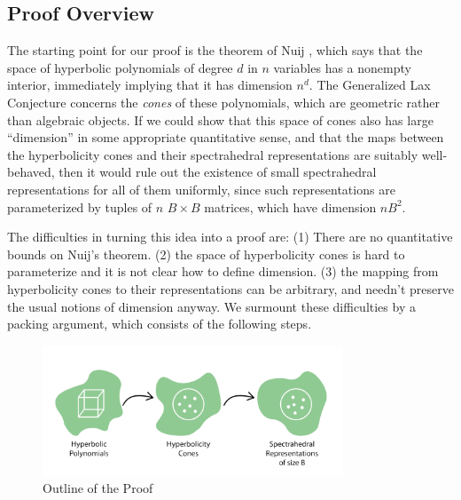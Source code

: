 \subsection{Proof Overview}

The starting point for our proof is the theorem of Nuij \cite{nuij1969note},
which says that the space of hyperbolic polynomials of degree $d$ in $n$
variables has a nonempty interior, immediately implying that it has dimension
$n^d$. The Generalized Lax Conjecture concerns the {\em cones} of these
polynomials, which are geometric rather than algebraic objects. If we could
show that this space of cones also has large ``dimension'' in some appropriate quantitative
sense, and that the maps between the hyperbolicity cones and their spectrahedral representations are 
suitably well-behaved, then it would rule out the existence of small spectrahedral
representations for all of them uniformly, since such representations are parameterized
by tuples of $n$  $B\times B$ matrices, which have dimension $nB^2$. 

The difficulties in turning this idea into a proof are: (1) There are no
quantitative bounds on Nuij's theorem. (2) the space of hyperbolicity cones is
hard to parameterize and it is not clear how to define dimension. (3) the
mapping from hyperbolicity cones to their representations can be arbitrary, and
needn't preserve the usual notions of dimension anyway. We surmount these
difficulties by a packing argument, which consists of the following steps.

\begin{figure}
	\centering
	\includegraphics[width=0.8\textwidth]{diagram.PNG}
	\caption{Outline of the Proof}
\end{figure}

